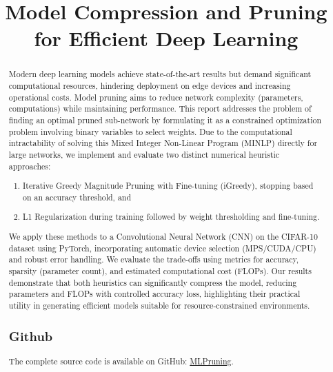 \documentclass[conference]{IEEEtran} %
\begin{document}
\title{Model Compression and Pruning for Efficient Deep Learning}

\author{
\and
{}
\and
{}
}

\maketitle

\begin{abstract}
    Modern deep learning models achieve state-of-the-art results but demand significant computational resources, hindering deployment on edge devices and increasing operational costs. Model pruning aims to reduce network complexity (parameters, computations) while maintaining performance. This report addresses the problem of finding an optimal pruned sub-network by formulating it as a constrained optimization problem involving binary variables to select weights. Due to the computational intractability of solving this Mixed Integer Non-Linear Program (MINLP) directly for large networks, we implement and evaluate two distinct numerical heuristic approaches: 
    \begin{enumerate}
        \item Iterative Greedy Magnitude Pruning with Fine-tuning (iGreedy), stopping based on an accuracy threshold, and 
        \item L1 Regularization during training followed by weight thresholding and fine-tuning. 
    \end{enumerate}
    We apply these methods to a Convolutional Neural Network (CNN) on the CIFAR-10 dataset using PyTorch, incorporating automatic device selection (MPS/CUDA/CPU) and robust error handling. We evaluate the trade-offs using metrics for accuracy, sparsity (parameter count), and estimated computational cost (FLOPs). Our results demonstrate that both heuristics can significantly compress the model, reducing parameters and FLOPs with controlled accuracy loss, highlighting their practical utility in generating efficient models suitable for resource-constrained environments.
    \\
    \subsection*{Github}
    \label{sec:github}
    The complete source code is available on GitHub: 
    \href{https://github.com/geetikak13/MLPruning}{\color{blue}MLPruning}.
\end{abstract}
\end{document}

